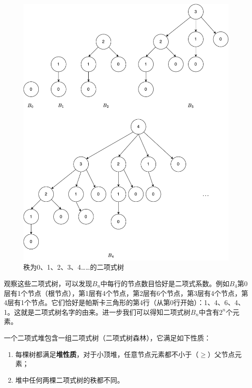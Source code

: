 \documentclass[b5paper]{ctexart}
\begin{document}
\begin{figure}[htbp]
  \centering
  \includegraphics[scale=0.45]{img/Bn-trees}
  \caption{秩为0、1、2、3、4……的二项式树}
  \label{fig:bitree-forms}
\end{figure}

观察这些二项式树，可以发现$B_n$中每行的节点数目恰好是二项式系数。例如$B_4$第0层有1个节点（根节点），第1层有4个节点，第2层有6个节点，第3层有4个节点，第4层有1个节点。它们恰好是帕斯卡三角形的第4行（从第0行开始）：1、4、6、4、1。这就是二项式树名字的由来。进一步我们可以得知二项式树$B_n$中含有$2^n$个元素。

一个二项式堆包含一组二项式树（二项式树森林），它满足如下性质：

\begin{enumerate}
\item 每棵树都满足\textbf{堆性质}，对于小顶堆，任意节点元素都不小于（$\geq$）父节点元素；
\item 堆中任何两棵二项式树的秩都不同。
\end{enumerate}
\end{document}
